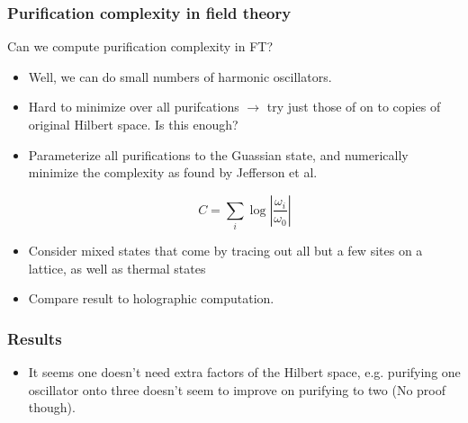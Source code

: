 \documentclass[10pt,aspectratio=169]{beamer}
\begin{document}
\begin{frame}
\frametitle{Purification complexity in field theory}

Can we compute purification complexity in FT?

\begin{itemize}

\item Well, we can do small numbers of harmonic oscillators.

\item Hard to minimize over all purifcations $\rightarrow$ try just those of on to copies of original Hilbert space. Is this enough?

\item Parameterize all purifications to the Guassian state, and numerically minimize the complexity as found by Jefferson et al.

$$C = \sum_i \log \left| \frac{\omega_i}{\omega_0} \right|$$

\item Consider mixed states that come by tracing out all but a few sites on a lattice, as well as thermal states

\item Compare result to holographic computation.

\end{itemize}

\end{frame}

\begin{frame}
\frametitle{Results}

\begin{itemize}

\item It seems one doesn't need extra factors of the Hilbert space, e.g. purifying one oscillator onto three doesn't seem to improve on purifying to two (No proof though).

\end{itemize}

\end{frame}
\end{document}
